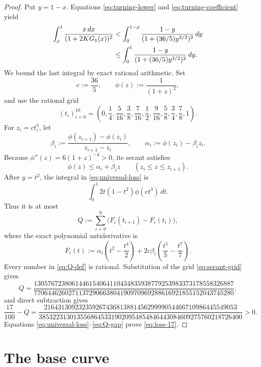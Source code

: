 \documentclass[11pt]{article}
\theoremstyle{remark}
\begin{document}
\begin{proof}
Put \(y=1-x\).  Equations \eqref{eq:turning-lower} and
\eqref{eq:turning-coefficient} yield
\begin{align}
 \int_\rho^1\frac{x\,dx}{(1+2KG_1(x))^2}
 &<
 \int_0^{1-\rho}
 \frac{1-y}{(1+(36/5)y^{3/2})^2}\,dy\notag\\
 &\leq
 \int_0^1
 \frac{1-y}{(1+(36/5)y^{3/2})^2}\,dy.
 \label{eq:universal-loss}
\end{align}
We bound the last integral by exact rational arithmetic.  Set
\[
 c:=\frac{36}{5},\qquad
 \phi(z):=\frac1{(1+z)^2},
 \]
and use the rational grid
\begin{equation}
 (t_i)_{i=0}^{10}=
 \left(
 0,\frac14,\frac5{16},\frac38,\frac7{16},\frac12,
 \frac9{16},\frac58,\frac34,\frac78,1
 \right).
 \label{eq:secant-grid}
\end{equation}
For \(z_i=ct_i^3\), let
\[
 \beta_i:=
 \frac{\phi(z_{i+1})-\phi(z_i)}{z_{i+1}-z_i},
 \qquad
 \alpha_i:=\phi(z_i)-\beta_i z_i.
 \]
Because \(\phi''(z)=6(1+z)^{-4}>0\), its secant satisfies
\[
 \phi(z)\leq\alpha_i+\beta_i z
 \qquad(z_i\leq z\leq z_{i+1}).
 \]
After \(y=t^2\), the integral in \eqref{eq:universal-loss} is
\[
 \int_0^1 2t(1-t^2)\phi(ct^3)\,dt.
 \]
Thus it is at most
\begin{equation}
 Q:=\sum_{i=0}^9
 \bigl(F_i(t_{i+1})-F_i(t_i)\bigr),
 \label{eq:Q-def}
\end{equation}
where the exact polynomial antiderivative is
\begin{equation}
 F_i(t):=
 \alpha_i\left(t^2-\frac{t^4}{2}\right)
 +2c\beta_i\left(\frac{t^5}{5}-\frac{t^7}{7}\right).
 \label{eq:Fi}
\end{equation}
Every number in \eqref{eq:Q-def} is rational.  Substitution of the grid
\eqref{eq:secant-grid} gives
\begin{equation}
 Q=
 \frac{
 1305767238061446154064110434835938779253983373178558326887
 }{
 7706446260271137290663804190970969288616921855152043745280
 },
 \label{eq:Q-value}
\end{equation}
and direct subtraction gives
\begin{equation}
 \frac{17}{100}-Q
 =
 \frac{
 21643130923235926743681388145629999054466710986445549053
 }{
 38532231301355686453319020954854846443084609275760218726400
 }>0.
 \label{eq:Q-gap}
\end{equation}
Equations \eqref{eq:universal-loss}--\eqref{eq:Q-gap} prove
\eqref{eq:loss-17}.
\end{proof}

\section{The base curve}
\end{document}
